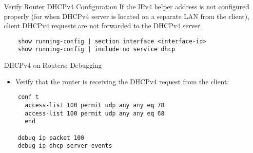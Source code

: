 \documentclass[../EngineeringJournal_CDavis.tex]{subfiles}
\begin{document}
\hspace{0.2cm}
\begin{tcolorbox}[width=6.3in]
Verify Router DHCPv4 Configuration
  \scriptsize 
If the IPv4 helper address is not configured properly 
(for when DHCPv4 server is located on a separate LAN from the client), 
client DHCPv4 requests are not forwarded to the DHCPv4 server.
  \begin{verbatim}
    show running-config | section interface <interface-id>
    show running-config | include no service dhcp
  \end{verbatim}
\end{tcolorbox}
\hspace{0.2cm}
\normalsize  




\hspace{0.2cm}
\begin{tcolorbox}[width=6.3in]
DHCPv4 on Routers: Debugging
  \scriptsize 
  \begin{itemize}
    \item{Verify that the router is receiving the DHCPv4 request from the client:} 
  \end{itemize}
  \begin{verbatim}
    conf t
      access-list 100 permit udp any any eq 78
      access-list 100 permit udp any any eq 68
      end
      
    debug ip packet 100
    debug ip dhcp server events
  \end{verbatim}
\end{tcolorbox}
\hspace{0.2cm}
\normalsize  

\end{document}
